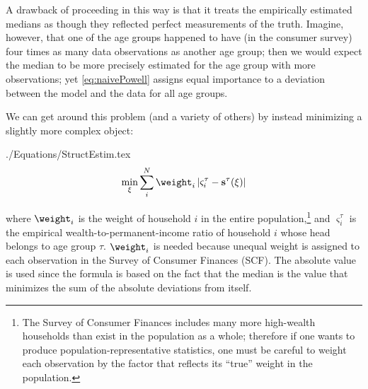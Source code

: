\documentclass[titlepage, headings=optiontotocandhead]{\econtex}
\begin{document}
A drawback of proceeding in this way is that it treats the empirically
estimated medians as though they reflected perfect measurements of the
truth. Imagine, however, that one of the age groups happened to have
(in the consumer survey) four times as many data observations as
another age group; then we would expect the median to be more
precisely estimated for the age group with more observations; yet
\eqref{eq:naivePowell} assigns equal importance to a deviation between
the model and the data for all age groups.

We can get around this problem (and a variety of others) by instead minimizing a slightly more complex object:
\begin{verbatimwrite}{./Equations/StructEstim.tex}
  \begin{equation}
    \min_{\xi}\sum\limits_{i}^{N}\weight _{i}\left|\varsigma_{i}^{\tau }-\mathbf{s}^{\tau}(\xi )\right|\label{eq:StructEstim}
  \end{equation}
\end{verbatimwrite}
\unskip
where $\weight_{i}$ is the weight of household $i$ in the entire
population,\footnote{The Survey of Consumer Finances includes many
  more high-wealth households than exist in the population as a whole;
  therefore if one wants to produce population-representative
  statistics, one must be careful to weight each observation by the
  factor that reflects its ``true'' weight in the population.} and
$\varsigma_{i}^{\tau }$ is the empirical wealth-to-permanent-income
ratio of household $i$ whose head belongs to age group
$\tau$. $\weight _{i}$ is needed because unequal weight is assigned to
each observation in the Survey of Consumer Finances (SCF). The
absolute value is used since the formula is based on the fact that the
median is the value that minimizes the sum of the absolute deviations
from itself.

\end{document}
